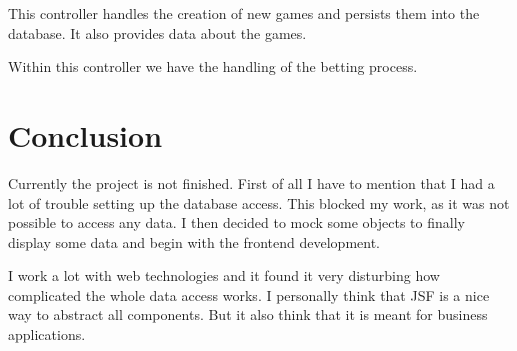\documentclass[11pt, halfparskip]{scrreprt}
\begin{document}
This controller handles the creation of new games and persists them into the database. It also provides data about the games.

Within this controller we have the handling of the betting process.

\chapter{Conclusion}
Currently the project is not finished. First of all I have to mention that I had a lot of trouble setting up the database access. This blocked my work, as it was not possible to access any data. I then decided to mock some objects to finally display some data and begin with the frontend development.

I work a lot with web technologies and it found it very disturbing how complicated the whole data access works. I personally think that JSF is a nice way to abstract all components. But it also think that it is meant for business applications. 
\end{document}
